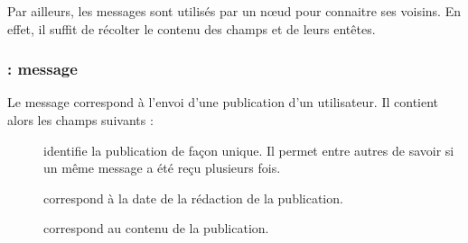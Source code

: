 Par ailleurs, les messages \msgheartbeat{} sont utilisés par un n\oe ud pour connaitre ses voisins.
En effet, il suffit de récolter le contenu des champs \fkfrom{} et \fknick{} de leurs entêtes.

\format{\foffers \apgdelim \fdemands}

\formatvar{\fvoffers}{\\\fvnodeid-\fvpriority,\fvnodeid-\fvpriority,\ldots}

\formatvar{\fvdemands}{\\\fvnodeid-\fvpriority,\fvnodeid-\fvpriority,\ldots}


\subsubsection{\Payload : message \msgpie}

Le message \msgpie{} correspond à l'envoi d'une publication d'un utilisateur.
Il contient alors les champs suivants :

\begin{description}
	\item[\fkmsgid] identifie la publication de façon unique. Il permet entre autres de savoir si un même message a été reçu plusieurs fois.
	\item[\fkmsgdate] correspond à la date de la rédaction de la publication.
	\item[\fkmsgcontent] correspond au contenu de la publication.
\end{description}

\format{\fmsgid \apgdelim \fmsgdate \apgdelim \fmsgcontent}

